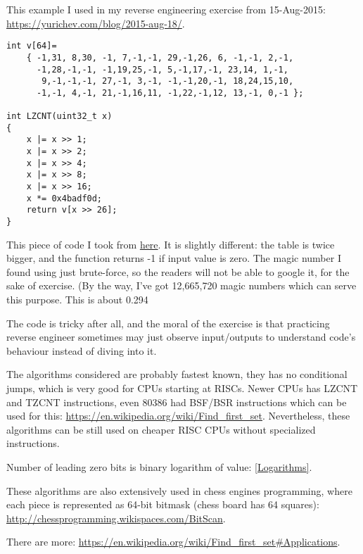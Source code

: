 This example I used in my reverse engineering exercise from 15-Aug-2015: \url{https://yurichev.com/blog/2015-aug-18/}.

\begin{lstlisting}
int v[64]=
	{ -1,31, 8,30, -1, 7,-1,-1, 29,-1,26, 6, -1,-1, 2,-1,
	  -1,28,-1,-1, -1,19,25,-1, 5,-1,17,-1, 23,14, 1,-1,
	   9,-1,-1,-1, 27,-1, 3,-1, -1,-1,20,-1, 18,24,15,10,
	  -1,-1, 4,-1, 21,-1,16,11, -1,22,-1,12, 13,-1, 0,-1 };

int LZCNT(uint32_t x)
{
    x |= x >> 1;
    x |= x >> 2;
    x |= x >> 4;
    x |= x >> 8;
    x |= x >> 16;
    x *= 0x4badf0d;
    return v[x >> 26];
}
\end{lstlisting}

This piece of code I took from \href{http://stackoverflow.com/questions/7365562/de-bruijn-like-sequence-for-2n-1-how-is-it-constructed/7369288#7369288}{here}.
It is slightly different: the table is twice bigger, and the function returns -1 if input value is zero.
The magic number I found using just brute-force, so the readers will not be able to google it, for the sake of exercise.
(By the way, I've got 12,665,720 magic numbers which can serve this purpose.
This is about 0.294%

The code is tricky after all, and the moral of the exercise is that practicing reverse engineer sometimes may just observe input/outputs to understand
code's behaviour instead of diving into it.


The algorithms considered are probably fastest known, they has no conditional jumps, which is very good for CPUs starting at RISCs.
Newer CPUs has LZCNT and TZCNT instructions, even 80386 had BSF/BSR instructions which can be used for this: 
\url{https://en.wikipedia.org/wiki/Find_first_set}.
Nevertheless, these algorithms can be still used on cheaper RISC CPUs without specialized instructions.


Number of leading zero bits is binary logarithm of value: \ref{Logarithms}.

These algorithms are also extensively used in chess engines programming, where each piece is represented as 64-bit bitmask (chess board has 64 squares):
\url{http://chessprogramming.wikispaces.com/BitScan}.

There are more: \url{https://en.wikipedia.org/wiki/Find_first_set\#Applications}.


